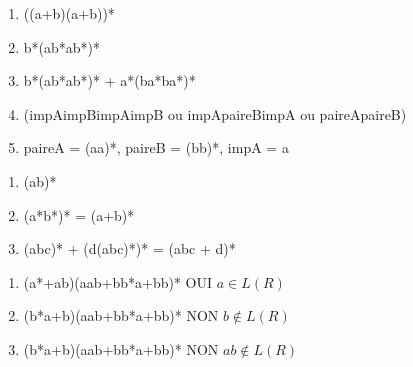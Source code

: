 \begin{enumerate}
	\item ((a+b)(a+b))*
	\item b*(ab*ab*)*
	\item b*(ab*ab*)* + a*(ba*ba*)*
	\item (impAimpBimpAimpB ou impApaireBimpA ou paireApaireB)
	\item paireA = (aa)*, paireB = (bb)*, impA = a
\end{enumerate}

\begin{enumerate}
	\item (ab)*
	\item (a*b*)* = (a+b)*
	\item (abc)* + (d(abc)*)* = (abc + d)*
\end{enumerate}

\begin{enumerate}
	\item (a*+ab)(aab+bb*a+bb)* OUI $a\in L(R)$
	\item (b*a+b)(aab+bb*a+bb)* NON $b\not\in L(R)$
	\item (b*a+b)(aab+bb*a+bb)* NON $ab\not\in L(R)$
\end{enumerate}

